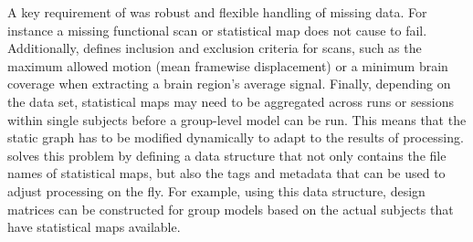 A key requirement of  was robust and flexible handling of missing data. For instance a missing functional scan or statistical map does not cause  to fail. Additionally,  defines inclusion and exclusion criteria for scans, such as the maximum allowed motion (mean framewise displacement) or a minimum brain coverage when extracting a brain region's average signal. Finally, depending on the data set, statistical maps may need to be aggregated across runs or sessions within single subjects before a group-level model can be run. This means that the static graph has to be modified dynamically to adapt to the results of processing.  solves this problem by defining a data structure that not only contains the file names of statistical maps, but also the tags and metadata that can be used to adjust processing on the fly. For example, using this data structure, design matrices can be constructed for group models based on the actual subjects that have statistical maps available.
